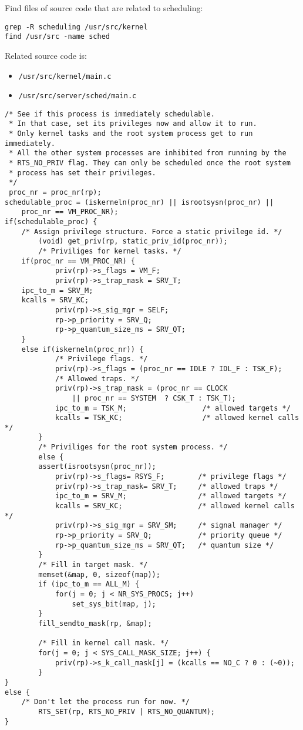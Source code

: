 \documentclass[a4paper]{article}
\begin{document}
Find files of source code that are related to scheduling:
\begin{verbatim}
grep -R scheduling /usr/src/kernel
find /usr/src -name sched
\end{verbatim}
Related source code is:
\begin{itemize}
    \item \texttt{/usr/src/kernel/main.c}
    \item \texttt{/usr/src/server/sched/main.c}
\end{itemize}
\begin{verbatim}
/* See if this process is immediately schedulable.
 * In that case, set its privileges now and allow it to run.
 * Only kernel tasks and the root system process get to run immediately.
 * All the other system processes are inhibited from running by the
 * RTS_NO_PRIV flag. They can only be scheduled once the root system
 * process has set their privileges.
 */
 proc_nr = proc_nr(rp);
schedulable_proc = (iskerneln(proc_nr) || isrootsysn(proc_nr) ||
	proc_nr == VM_PROC_NR);
if(schedulable_proc) {
    /* Assign privilege structure. Force a static privilege id. */
        (void) get_priv(rp, static_priv_id(proc_nr));
        /* Priviliges for kernel tasks. */
    if(proc_nr == VM_PROC_NR) {
            priv(rp)->s_flags = VM_F;
            priv(rp)->s_trap_mask = SRV_T;
	ipc_to_m = SRV_M;
	kcalls = SRV_KC;
            priv(rp)->s_sig_mgr = SELF;
            rp->p_priority = SRV_Q;
            rp->p_quantum_size_ms = SRV_QT;
    }
    else if(iskerneln(proc_nr)) {
            /* Privilege flags. */
            priv(rp)->s_flags = (proc_nr == IDLE ? IDL_F : TSK_F);
            /* Allowed traps. */
            priv(rp)->s_trap_mask = (proc_nr == CLOCK 
                || proc_nr == SYSTEM  ? CSK_T : TSK_T);
            ipc_to_m = TSK_M;                  /* allowed targets */
            kcalls = TSK_KC;                   /* allowed kernel calls */
        }
        /* Priviliges for the root system process. */
        else {
    	assert(isrootsysn(proc_nr));
            priv(rp)->s_flags= RSYS_F;        /* privilege flags */
            priv(rp)->s_trap_mask= SRV_T;     /* allowed traps */
            ipc_to_m = SRV_M;                 /* allowed targets */
            kcalls = SRV_KC;                  /* allowed kernel calls */
            priv(rp)->s_sig_mgr = SRV_SM;     /* signal manager */
            rp->p_priority = SRV_Q;	          /* priority queue */
            rp->p_quantum_size_ms = SRV_QT;   /* quantum size */
        }
        /* Fill in target mask. */
        memset(&map, 0, sizeof(map));
        if (ipc_to_m == ALL_M) {
            for(j = 0; j < NR_SYS_PROCS; j++)
                set_sys_bit(map, j);
        }
        fill_sendto_mask(rp, &map);

        /* Fill in kernel call mask. */
        for(j = 0; j < SYS_CALL_MASK_SIZE; j++) {
            priv(rp)->s_k_call_mask[j] = (kcalls == NO_C ? 0 : (~0));
        }
}
else {
    /* Don't let the process run for now. */
        RTS_SET(rp, RTS_NO_PRIV | RTS_NO_QUANTUM);
}
\end{verbatim}
\end{document}
